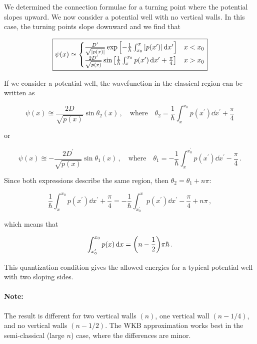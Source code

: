 \documentclass[12pt, titlepage]{article}
\begin{document}
We determined the connection formulae for a turning point where the potential slopes upward. We now consider a potential well with no vertical walls. In this case, the turning points slope downward and we find that

\begin{equation}
\boxed{\psi(x)\simeq \begin{cases}
	\frac{D^\prime}{\sqrt{|p(x)|}}\exp\qty[-\frac{1}{\hbar}\int_{x_0}^{x}|p(x^\prime)|\dd{x^\prime}] & x<x_0 \\
	\frac{2D^\prime}{\sqrt{p(x)}}\sin\qty[\frac{1}{\hbar}\int_{x}^{x_0}p(x^\prime) \dd{x^\prime} + \frac{\pi}{4}] & x > x_0 
	\end{cases}}
\end{equation} 

If we consider a potential well, the wavefunction in the classical region can be written as 

\begin{equation}
	\psi(x)\approxeq \frac{2D}{\sqrt{p(x)}}\sin\theta_2(x) \,, \quad\text{where}\quad \theta_2 = \frac{1}{\hbar}\int_{x}^{x_0}p(x^\prime)\dd{x^\prime} + \frac{\pi}{4}
\end{equation}

or 

\begin{equation}
	\psi(x)\approxeq -\frac{2D^\prime}{\sqrt{p(x)}}\sin\theta_1(x) \,, \quad\text{where}\quad \theta_1 = -\frac{1}{\hbar}\int_{x}^{x_0^\prime}p(x^\prime)\dd{x^\prime} - \frac{\pi}{4} \,.
\end{equation}

Since both expressions describe the same region, then $\theta_2 = \theta_1 + n\pi$:

\begin{equation*}
	\frac{1}{\hbar}\int_{x}^{x_0}p(x^\prime)\dd{x^\prime} + \frac{\pi}{4} = -\frac{1}{\hbar}\int_{x_0^\prime}^{x}p(x^\prime)\dd{x^\prime} - \frac{\pi}{4} + n\pi \,,
\end{equation*}

which means that

\begin{equation}
	\int_{x_0^\prime}^{x_0}p(x)\dd{x} = \qty(n-\frac{1}{2})\pi\hbar \,.
\end{equation}

This quantization condition gives the allowed energies for a typical potential well with two sloping sides. 

\begin{mdframed}
\paragraph*{Note:}
The result is different for two vertical walls $(n)$, one vertical wall $(n-1/4)$, and no vertical walls $(n-1/2)$. The WKB approximation works best in the semi-classical (large $n$) case, where the differences are minor.
\end{mdframed}
\end{document}

